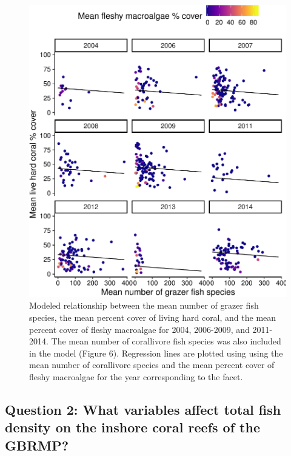 \documentclass[12pt,]{article}
\begin{document}
\begin{figure}

{\centering \includegraphics{Mullaney_ENV872_Project_files/figure-latex/Coral Percent Cover Plot (Grazers)-1} 

}

\caption{Modeled relationship between the mean number of grazer fish species, the mean percent cover of living hard coral, and the mean percent cover of fleshy macroalgae for 2004, 2006-2009, and 2011-2014. The mean number of corallivore fish species was also included in the model (Figure 6). Regression lines are plotted using using the mean number of corallivore species and the mean percent cover of fleshy macroalgae for the year corresponding to the facet.}\label{fig:Coral Percent Cover Plot (Grazers)}
\end{figure}

\newpage

\hypertarget{question-2-what-variables-affect-total-fish-density-on-the-inshore-coral-reefs-of-the-gbrmp}{%
\subsection{Question 2: What variables affect total fish density on the
inshore coral reefs of the
GBRMP?}\label{question-2-what-variables-affect-total-fish-density-on-the-inshore-coral-reefs-of-the-gbrmp}}
\end{document}
